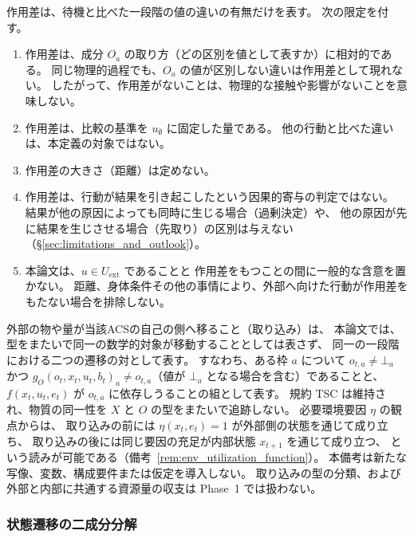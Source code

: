 \begin{remark}[作用差の射程]
\label{rem:action_difference_scope}
作用差は、待機と比べた一段階の値の違いの有無だけを表す。
次の限定を付す。
\begin{enumerate}[label=(\alph*)]
  \item 作用差は、成分 $O_a$ の取り方（どの区別を値として表すか）に相対的である。
  同じ物理的過程でも、$O_a$ の値が区別しない違いは作用差として現れない。
  したがって、作用差がないことは、物理的な接触や影響がないことを意味しない。
  \item 作用差は、比較の基準を $u_{\emptyset}$ に固定した量である。
  他の行動と比べた違いは、本定義の対象ではない。
  \item 作用差の大きさ（距離）は定めない。
  \item 作用差は、行動が結果を引き起こしたという因果的寄与の判定ではない。
  結果が他の原因によっても同時に生じる場合（過剰決定）や、
  他の原因が先に結果を生じさせる場合（先取り）の区別は与えない
  （\S\ref{sec:limitations_and_outlook}）。
  \item 本論文は、$u\in U_{\mathrm{ext}}$ であることと
  作用差をもつことの間に一般的な含意を置かない。
  距離、身体条件その他の事情により、外部へ向けた行動が作用差をもたない場合を排除しない。
\end{enumerate}
\end{remark}

\begin{remark}[自己の側への取り込みの表現]
\label{rem:intake_joint_transition}
外部の物や量が当該ACSの自己の側へ移ること（取り込み）は、
本論文では、型をまたいで同一の数学的対象が移動することとしては表さず、
同一の一段階における二つの遷移の対として表す。
すなわち、ある枠 $a$ について $o_{t,a}\neq\bot_a$ かつ
$g_O(o_t,x_t,u_t,b_t)_a\neq o_{t,a}$（値が $\bot_a$ となる場合を含む）であることと、
$f(x_t,u_t,e_t)$ が $o_{t,a}$ に依存しうることの組として表す。
規約 TSC は維持され、物質の同一性を $X$ と $O$ の型をまたいで追跡しない。
必要環境要因 $\eta$ の観点からは、
取り込みの前には $\eta(x_t,e_t)=1$ が外部側の状態を通じて成り立ち、
取り込みの後には同じ要因の充足が内部状態 $x_{t+1}$ を通じて成り立つ、
という読みが可能である（備考~\ref{rem:env_utilization_function}）。
本備考は新たな写像、変数、構成要件または仮定を導入しない。
取り込みの型の分類、および外部と内部に共通する資源量の収支は
Phase~1 では扱わない。
\end{remark}

\subsubsection{状態遷移の二成分分解}

